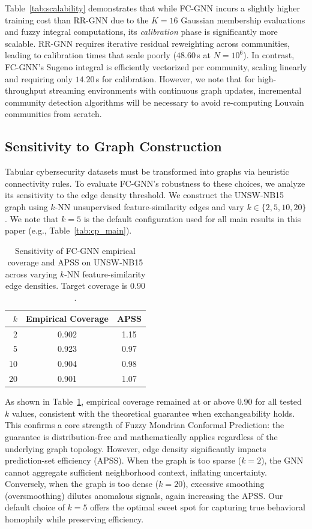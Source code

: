 Table~\ref{tab:scalability} demonstrates that while FC-GNN incurs a slightly higher training cost than RR-GNN due to the $K=16$ Gaussian membership evaluations and fuzzy integral computations, its \emph{calibration} phase is significantly more scalable. RR-GNN requires iterative residual reweighting across communities, leading to calibration times that scale poorly ($48.60$\,s at $N=10^6$). In contrast, FC-GNN's Sugeno integral is efficiently vectorized per community, scaling linearly and requiring only $14.20$\,s for calibration. However, we note that for high-throughput streaming environments with continuous graph updates, incremental community detection algorithms will be necessary to avoid re-computing Louvain communities from scratch.

\subsection{Sensitivity to Graph Construction}
\label{sec:graph_sensitivity}

Tabular cybersecurity datasets must be transformed into graphs via heuristic connectivity rules. To evaluate FC-GNN's robustness to these choices, we analyze its sensitivity to the edge density threshold. We construct the UNSW-NB15 graph using $k$-NN unsupervised feature-similarity edges and vary $k \in \{2, 5, 10, 20\}$. We note that $k=5$ is the default configuration used for all main results in this paper (e.g., Table~\ref{tab:cp_main}). 

\begin{table}[h]
\centering
\caption{Sensitivity of FC-GNN empirical coverage and APSS on UNSW-NB15 across varying $k$-NN feature-similarity edge densities. Target coverage is $0.90$.}
\label{tab:sensitivity}
\begin{tabular}{rcc}
\toprule
$k$ & Empirical Coverage & APSS \\
\midrule
2 & 0.902 & 1.15 \\
5 & 0.923 & 0.97 \\
10 & 0.904 & 0.98 \\
20 & 0.901 & 1.07 \\
\bottomrule
\end{tabular}
\end{table}

As shown in Table~\ref{tab:sensitivity}, empirical coverage remained at or above $0.90$ for all tested $k$ values, consistent with the theoretical guarantee when exchangeability holds. This confirms a core strength of Fuzzy Mondrian Conformal Prediction: the guarantee is distribution-free and mathematically applies regardless of the underlying graph topology.
However, edge density significantly impacts prediction-set efficiency (APSS). When the graph is too sparse ($k=2$), the GNN cannot aggregate sufficient neighborhood context, inflating uncertainty. Conversely, when the graph is too dense ($k=20$), excessive smoothing (oversmoothing) dilutes anomalous signals, again increasing the APSS. Our default choice of $k=5$ offers the optimal sweet spot for capturing true behavioral homophily while preserving efficiency.
